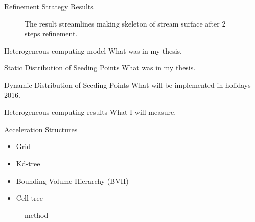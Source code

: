 \documentclass{beamer}
\begin{document}
\begin{frame}{Refinement Strategy Results}
	\begin{figure}
		\centering
		\caption{The result streamlines making skeleton of stream surface after 2 steps refinement.}
	\end{figure}
\end{frame}

\begin{frame}{Heterogeneous computing model}
	What was in my thesis.
\end{frame}

\begin{frame}{Static Distribution of Seeding Points}
	What was in my thesis.
\end{frame}

\begin{frame}{Dynamic Distribution of Seeding Points}
	What will be implemented in holidays 2016.
\end{frame}

\begin{frame}{Heterogeneous computing results}
	What I will measure.
\end{frame}

\begin{frame}{Acceleration Structures}
	\begin{itemize}
		\item Grid
		\item Kd-tree
		\item Bounding Volume Hierarchy (BVH)
		\item Cell-tree \cite{GarthPaper}
	\end{itemize}

	\begin{figure}[!ht]
		\centering
		
		
		\caption{method}
	\end{figure}

\end{frame}
\end{document}
